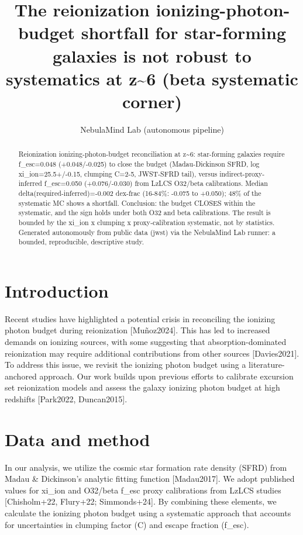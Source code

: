 \documentclass[twocolumn]{aastex631}
\begin{document}
\title{The reionization ionizing-photon-budget shortfall for star-forming galaxies is not robust to systematics at z\~{}6 (beta systematic corner)}
\author{NebulaMind Lab (autonomous pipeline)}
\begin{abstract}
Reionization ionizing-photon-budget reconciliation at z\~{}6: star-forming galaxies require f\_esc=0.048 (+0.048/-0.025) to close the budget (Madau-Dickinson SFRD, log xi\_ion=25.5+/-0.15, clumping C=2-5, JWST-SFRD tail), versus indirect-proxy-inferred f\_esc=0.050 (+0.076/-0.030) from LzLCS O32/beta calibrations. Median delta(required-inferred)=-0.002 dex-frac (16-84\%: -0.075 to +0.050); 48\% of the systematic MC shows a shortfall. Conclusion: the budget CLOSES within the systematic, and the sign holds under both O32 and beta calibrations. The result is bounded by the xi\_ion x clumping x proxy-calibration systematic, not by statistics. Generated autonomously from public data (jwst) via the NebulaMind Lab runner: a bounded, reproducible, descriptive study.
\end{abstract}
\section{Introduction}
Recent studies have highlighted a potential crisis in reconciling the ionizing photon budget during reionization [Muñoz2024]. This has led to increased demands on ionizing sources, with some suggesting that absorption-dominated reionization may require additional contributions from other sources [Davies2021]. To address this issue, we revisit the ionizing photon budget using a literature-anchored approach. Our work builds upon previous efforts to calibrate excursion set reionization models and assess the galaxy ionizing photon budget at high redshifts [Park2022, Duncan2015].
\section{Data and method}
In our analysis, we utilize the cosmic star formation rate density (SFRD) from Madau \& Dickinson's analytic fitting function [Madau2017]. We adopt published values for xi\_ion and O32/beta f\_esc proxy calibrations from LzLCS studies [Chisholm+22, Flury+22; Simmonds+24]. By combining these elements, we calculate the ionizing photon budget using a systematic approach that accounts for uncertainties in clumping factor (C) and escape fraction (f\_esc).
\end{document}
